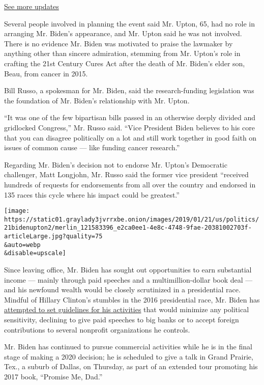 \href{https://www.nytimes3xbfgragh.onion/live/2020/08/21/us/dnc-convention-election?action=click\&pgtype=Article\&state=default\&region=MAIN_CONTENT_1\&context=storylines_live_updates}{See
more updates}

Several people involved in planning the event said Mr. Upton, 65, had no
role in arranging Mr. Biden's appearance, and Mr. Upton said he was not
involved. There is no evidence Mr. Biden was motivated to praise the
lawmaker by anything other than sincere admiration, stemming from Mr.
Upton's role in crafting the 21st Century Cures Act after the death of
Mr. Biden's elder son, Beau, from cancer in 2015.

Bill Russo, a spokesman for Mr. Biden, said the research-funding
legislation was the foundation of Mr. Biden's relationship with Mr.
Upton.

``It was one of the few bipartisan bills passed in an otherwise deeply
divided and gridlocked Congress,'' Mr. Russo said. ``Vice President
Biden believes to his core that you can disagree politically on a lot
and still work together in good faith on issues of common cause --- like
funding cancer research.''

Regarding Mr. Biden's decision not to endorse Mr. Upton's Democratic
challenger, Matt Longjohn, Mr. Russo said the former vice president
``received hundreds of requests for endorsements from all over the
country and endorsed in 135 races this cycle where his impact could be
greatest.''

\texttt{[image: https://static01.graylady3jvrrxbe.onion/images/2019/01/21/us/politics/21bidenupton2/merlin\_121583396\_e2ca0ee1-4e8c-4748-9fae-20381002703f-articleLarge.jpg?quality=75\\\&auto=webp\\\&disable=upscale]}

Since leaving office, Mr. Biden has sought out opportunities to earn
substantial income --- mainly through paid speeches and a
multimillion-dollar book deal --- and his newfound wealth would be
closely scrutinized in a presidential race. Mindful of Hillary Clinton's
stumbles in the 2016 presidential race, Mr. Biden has
\href{https://www.nytimes3xbfgragh.onion/2019/01/01/us/politics/joe-biden-presidential-campaign-2020.html}{attempted
to set guidelines for his activities} that would minimize any political
sensitivity, declining to give paid speeches to big banks or to accept
foreign contributions to several nonprofit organizations he controls.

Mr. Biden has continued to pursue commercial activities while he is in
the final stage of making a 2020 decision; he is scheduled to give a
talk in Grand Prairie, Tex., a suburb of Dallas, on Thursday, as part of
an extended tour promoting his 2017 book, ``Promise Me, Dad.''

